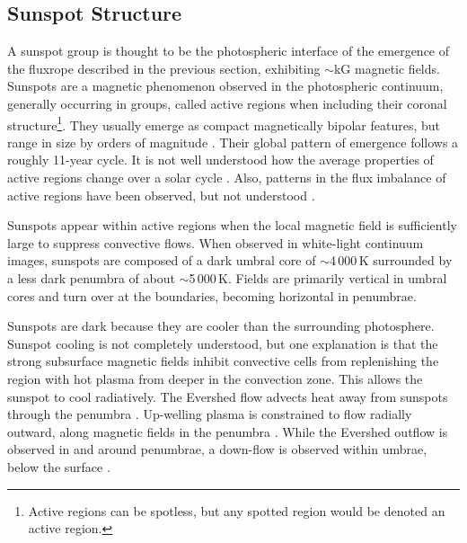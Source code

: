 \subsection{Sunspot Structure}\label{sect:sunspots}

A sunspot group is thought to be the photospheric interface of the emergence of the \gls{fluxrope} described in the previous section, exhibiting $\sim$kG magnetic fields. 
Sunspots are a magnetic phenomenon observed in the photospheric continuum, generally occurring in groups, called active regions when including their coronal structure\footnote{Active regions can be spotless, but any spotted region would be denoted an active region.}. They usually emerge as compact magnetically bipolar features, but range in size by orders of magnitude \citep{parnell:2009}. Their global pattern of emergence follows a roughly 11-year cycle. It is not well understood how the average properties of active regions change over a solar cycle \citep{harvey:1993}. Also, patterns in the flux imbalance of active regions have been observed, but not understood \citep{zharkov:2006}. %

Sunspots appear within active regions when the local magnetic field is sufficiently large to suppress convective flows. When observed in white-light continuum images, sunspots are composed of a dark umbral core of $\sim$4\,000\,K surrounded by a less dark penumbra of about $\sim$5\,000\,K. Fields are primarily vertical in umbral cores and turn over at the boundaries, becoming horizontal in penumbrae. 

Sunspots are dark because they are cooler than the surrounding photosphere. Sunspot cooling is not completely understood, but one explanation is that the strong subsurface magnetic fields inhibit convective cells from replenishing the region with hot plasma from deeper in the convection zone. This allows the sunspot to cool radiatively. The Evershed flow \citep{Evershed:1909} advects heat away from sunspots through the penumbra \citep{Schlichenmaier:2003}. Up-welling plasma is constrained to flow radially outward, along  magnetic fields in the penumbra \citep{Solanki:1994}. While the Evershed outflow is observed in and around penumbrae, a down-flow is observed within umbrae, below the surface \citep{Duvall:1996}.


